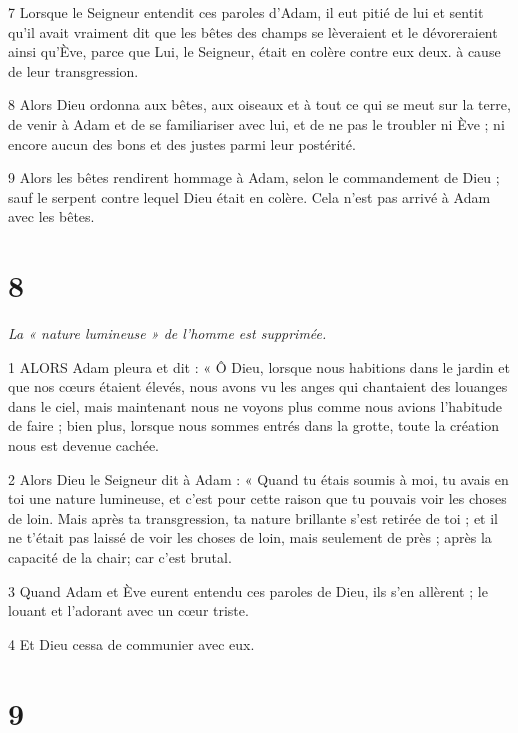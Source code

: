 \par 7 Lorsque le Seigneur entendit ces paroles d'Adam, il eut pitié de lui et sentit qu'il avait vraiment dit que les bêtes des champs se lèveraient et le dévoreraient ainsi qu'Ève, parce que Lui, le Seigneur, était en colère contre eux deux. à cause de leur transgression.

\par 8 Alors Dieu ordonna aux bêtes, aux oiseaux et à tout ce qui se meut sur la terre, de venir à Adam et de se familiariser avec lui, et de ne pas le troubler ni Ève ; ni encore aucun des bons et des justes parmi leur postérité.

\par 9 Alors les bêtes rendirent hommage à Adam, selon le commandement de Dieu ; sauf le serpent contre lequel Dieu était en colère. Cela n’est pas arrivé à Adam avec les bêtes.

\chapter{8}

\par \textit{La « nature lumineuse » de l'homme est supprimée.}

\par 1 ALORS Adam pleura et dit : « Ô Dieu, lorsque nous habitions dans le jardin et que nos cœurs étaient élevés, nous avons vu les anges qui chantaient des louanges dans le ciel, mais maintenant nous ne voyons plus comme nous avions l'habitude de faire ; bien plus, lorsque nous sommes entrés dans la grotte, toute la création nous est devenue cachée.

\par 2 Alors Dieu le Seigneur dit à Adam : « Quand tu étais soumis à moi, tu avais en toi une nature lumineuse, et c'est pour cette raison que tu pouvais voir les choses de loin. Mais après ta transgression, ta nature brillante s'est retirée de toi ; et il ne t'était pas laissé de voir les choses de loin, mais seulement de près ; après la capacité de la chair; car c’est brutal.

\par 3 Quand Adam et Ève eurent entendu ces paroles de Dieu, ils s'en allèrent ; le louant et l’adorant avec un cœur triste.

\par 4 Et Dieu cessa de communier avec eux.

\chapter{9}

